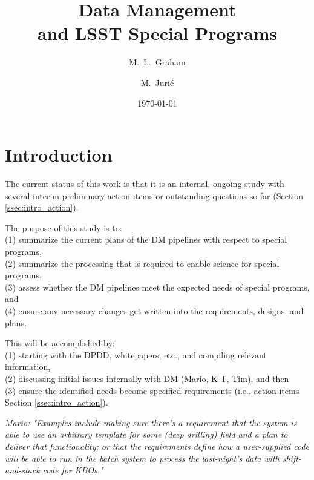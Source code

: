 \documentclass[DM,lsstdraft,toc]{lsstdoc}
\title[LSST Special Programs]{Data Management \\ and LSST Special Programs}
\author{M.~L.~Graham}
\author{M.~Juri\'{c}}
\date{\today}
\begin{document}
\maketitle




\section{Introduction} \label{sec:intro}

\noindent The current status of this work is that it is an internal, ongoing study with several interim preliminary action items or outstanding questions so far (Section \ref{ssec:intro_action}).

\noindent The purpose of this study is to: \\
(1) summarize the current plans of the DM pipelines with respect to special programs, \\
(2) summarize the processing that is required to enable science for special programs, \\
(3) assess whether the DM pipelines meet the expected needs of special programs, and \\
(4) ensure any necessary changes get written into the requirements, designs, and plans.

\noindent This will be accomplished by: \\
(1) starting with the DPDD, whitepapers, etc., and compiling relevant information, \\
(2) discussing initial issues internally with DM (Mario, K-T, Tim), and then \\
(3) ensure the identified needs become specified requirements (i.e., action items Section \ref{ssec:intro_action}).

{\it Mario: "Examples include making sure there's a requirement that the system is able to use an arbitrary template for some (deep drilling) field and a plan to deliver that functionality; or that the requirements define how a user-supplied code will be able to run in the batch system to process the last-night's data with shift-and-stack code for KBOs."}
\end{document}
